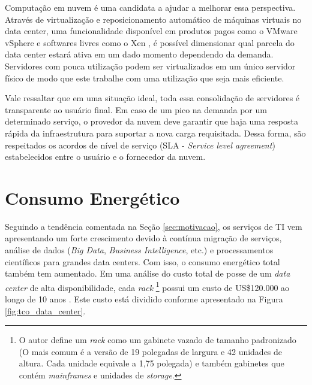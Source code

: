 Computação em nuvem é uma
candidata a ajudar a melhorar essa perspectiva. Através de virtualização e
reposicionamento automático de máquinas virtuais no data center,
uma funcionalidade disponível em produtos pagos como o VMware
vSphere \cite{vmware:vmotion} e softwares livres como o Xen 
\cite{alkmin:migracao_maquinas_virtuais}, é possível dimensionar
qual parcela do data center estará ativa em um dado momento dependendo da
demanda. Servidores com pouca utilização podem ser virtualizados em um único
servidor físico de modo que este trabalhe com uma utilização que seja mais
eficiente.

Vale ressaltar que em uma situação ideal, toda essa consolidação de servidores
é transparente ao usuário final. Em caso de um pico na demanda por um determinado
serviço, o provedor da nuvem deve garantir que haja uma resposta rápida da 
infraestrutura para suportar a nova carga requisitada. Dessa forma, são 
respeitados os acordos de nível de serviço (SLA - \emph{Service level agreement})
estabelecidos entre o usuário e o fornecedor da nuvem.

\section{Consumo Energético}
\label{sec:consumo_energetico}

Seguindo a tendência comentada na Seção \ref{sec:motivacao}, os serviços de TI
vem apresentando um forte crescimento devido à contínua migração de serviços,
análise de dados (\emph{Big Data}, \emph{Business Intelligence}, etc.) e
processamentos científicos para grandes data centers. Com isso, o consumo
energético total também tem aumentado. Em uma análise do custo
total de posse de um \emph{data center} de alta disponibilidade, cada \emph{rack}
\footnote{O autor define um \emph{rack} como um gabinete vazado de tamanho
padronizado (O mais comum é a versão de 19 polegadas de largura e 42 unidades
de altura. Cada unidade equivale a 1,75 polegada) e também gabinetes que contém
\emph{mainframes} e unidades de \emph{storage}.} possui um custo de US\$120.000
ao longo de 10 anos \cite{rasmussen:tco_data_center}.
Este custo está dividido conforme apresentado na Figura \ref{fig:tco_data_center}.

\newcommand{\slice}[4]{
  \pgfmathparse{0.5*#1+0.5*#2}
  \let\midangle\pgfmathresult

  \draw[thick,fill=black!10] (0,0) -- (#1:1) arc (#1:#2:1) -- cycle;

  \node[label=\midangle:#4] at (\midangle:1) {};

  \pgfmathparse{min((#2-#1-10)/110*(-0.3),0)}
  \let\temp\pgfmathresult
  \pgfmathparse{max(\temp,-0.5) + 0.8}
  \let\innerpos\pgfmathresult
  \node at (\midangle:\innerpos) {#3};
}


